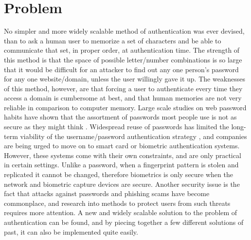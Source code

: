 \documentclass[11pt]{article}
\begin{document}
\section{Problem} \label{sec:prob}
No simpler and more widely scalable method of authentication was ever devised, than to ask a human user to memorize a set of characters and be able to communicate that set, in proper order, at authentication time.  The strength of this method is that the space of possible letter/number combinations is so large that it would be difficult for an attacker to find out any one person's password for any one website/domain, unless the user willingly gave it up.  The weaknesses of this method, however, are that forcing a user to authenticate every time they access a domain is cumbersome at best, and that human memories are not very reliable in comparison to computer memory.  Large scale studies on web password habits have shown that the assortment of passwords most people use is not as secure as they might think \cite{habits}.  Widespread reuse of passwords has limited the long-term viability of the username/password authentication strategy \cite{domino}, and companies are being urged to move on to smart card or biometric authentication systems.  However, these systems come with their own constraints, and are only practical in certain settings. Unlike a password, when a fingerprint pattern is stolen and replicated it cannot be changed, therefore biometrics is only secure when the network and biometric capture devices are secure.  Another security issue is the fact that attacks against passwords and phishing scams have become commonplace, and research into methods to protect users from such threats requires more attention.  A new and widely scalable solution to the problem of authentication can be found, and by piecing together a few different solutions of past, it can also be implemented quite easily.
\end{document}
